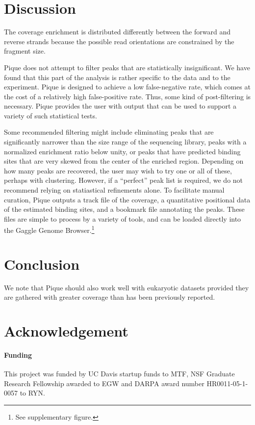 \documentclass{bioinfo}
\begin{document}
\section{Discussion}

The coverage enrichment is distributed differently between the forward
and reverse strands because the possible read orientations are
constrained by the fragment size.

Pique does not attempt to filter peaks that are statistically
insignificant. We have found that this part of the analysis is rather
specific to the data and to the experiment. Pique is designed to
achieve a low false-negative rate, which comes at the cost of a
relatively high false-positive rate. Thus, some kind of post-filtering
is necessary. Pique provides the user with output that can be used to
support a variety of such statistical tests.

Some recommended filtering might include eliminating peaks that are
significantly narrower than the size range of the sequencing library,
peaks with a normalized enrichment ratio below unity, or peaks that
have predicted binding sites that are very skewed from the center of
the enriched region. Depending on how many peaks are recovered, the
user may wish to try one or all of these, perhaps with
clustering. However, if a ``perfect'' peak list is required, we do not
recommend relying on statiastical refinements alone. To facilitate
manual curation, Pique outputs a track file of the coverage, a
quantitative positional data of the estimated binding sites, and a
bookmark file annotating the peaks. These files are simple to process
by a variety of tools, and can be loaded directly into the Gaggle
Genome Browser.\footnote{See supplementary figure.}

\section{Conclusion}

We note that Pique should also work well with eukaryotic datasets
provided they are gathered with greater coverage than has been
previously reported.

\section*{Acknowledgement}
\paragraph{Funding\textcolon} 

This project was funded by UC Davis startup funds to MTF, NSF Graduate
Research Fellowship awarded to EGW and DARPA award number
HR0011-05-1-0057 to RYN.

%
%
%
%
%




\end{document}
